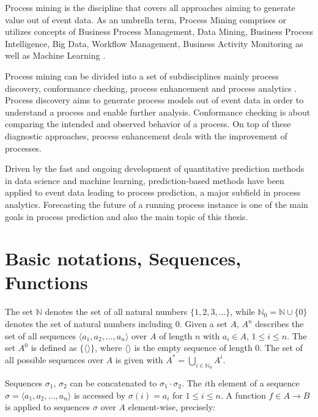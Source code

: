 Process mining is the discipline that covers all approaches aiming to generate value out of event data.
As an umbrella term, Process Mining comprises or utilizes concepts of Business Process Management, Data Mining, Business Process Intelligence, Big Data, Workflow Management, Business Activity Monitoring \cite{DBLP:books/sp/Aalst16} as well as Machine Learning \cite{DBLP:conf/bpm/VeitGMHT17}.

Process mining can be divided into a set of subdisciplines mainly process discovery, conformance checking, process enhancement and process analytics \cite{DBLP:conf/caise/EckLLA15}.
Process discovery aims to generate process models out of event data in order to understand a process and enable further analysis.
Conformance checking is about comparing the intended and observed behavior of a process. 
On top of these diagnostic approaches, process enhancement deals with the improvement of processes.

Driven by the fast and ongoing development of quantitative prediction methods in data science and machine learning, prediction-based methods have been applied to event data leading to process prediction, a major subfield in process analytics.
Forecasting the future of a running process instance is one of the main goals in process prediction and also the main topic of this thesis.


\section{Basic notations, Sequences, Functions}

The set $\mathbb{N}$ denotes the set of all natural numbers $\{1, 2, 3, \dots\}$, while $\mathbb{N}_0 = \mathbb{N} \cup \{0\}$ denotes the set of natural numbers including 0.
Given a set $A$, $A^n$ describes the set of all sequences $\langle a_1, a_2, \dots, a_n\rangle$ over $A$ of length $n$ with $a_i \in A$, $1 \leq i \leq n$.
The set $A^0$ is defined as $\{\langle \rangle\}$, where $\langle \rangle$ is the empty sequence of length $0$.
The set of all possible sequences over $A$ is given with $A^* = \bigcup\limits_{i\in \mathbb{N}_0} A^i$.

Sequences $\sigma_1$, $\sigma_2$ can be concatenated to $\sigma_1 \cdot \sigma_2$.
The $i$th element of a sequence $\sigma = \langle a_1, a_2, \dots, a_n\rangle$ is accessed by $\sigma(i)= a_i$ for $1 \leq i \leq n$.
A function $f \in A \rightarrow B$ is applied to sequences $\sigma$ over $A$ element-wise, precisely:

